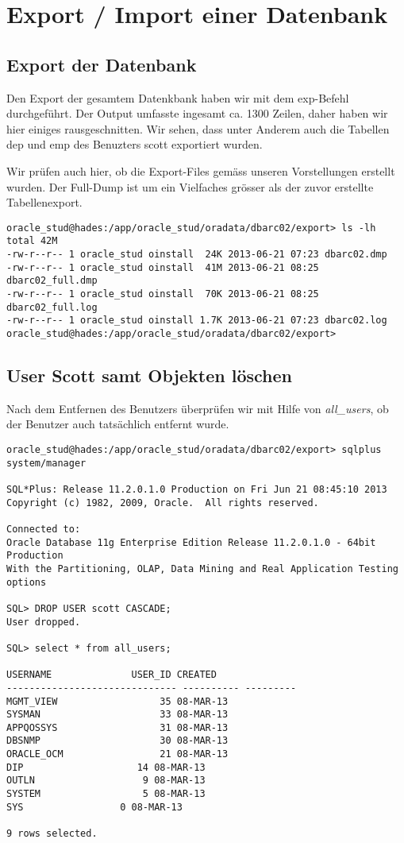 \documentclass[11pt,a4paper,parskip=half]{scrartcl}
\begin{document}
\newpage
\section{Export / Import einer Datenbank}
\subsection{Export der Datenbank}
Den Export der gesamtem Datenkbank haben wir mit dem exp-Befehl durchgeführt. Der Output umfasste ingesamt ca. 1300 Zeilen, daher haben wir hier einiges rausgeschnitten. Wir sehen, dass unter Anderem auch die Tabellen \glqq{}dep\grqq{} und \glqq{}emp\grqq{} des Benuzters scott exportiert wurden.


Wir prüfen auch hier, ob die Export-Files gemäss unseren Vorstellungen erstellt wurden. Der Full-Dump ist um ein Vielfaches grösser als der zuvor erstellte Tabellenexport.
\begin{lstlisting}
oracle_stud@hades:/app/oracle_stud/oradata/dbarc02/export> ls -lh
total 42M
-rw-r--r-- 1 oracle_stud oinstall  24K 2013-06-21 07:23 dbarc02.dmp
-rw-r--r-- 1 oracle_stud oinstall  41M 2013-06-21 08:25 dbarc02_full.dmp
-rw-r--r-- 1 oracle_stud oinstall  70K 2013-06-21 08:25 dbarc02_full.log
-rw-r--r-- 1 oracle_stud oinstall 1.7K 2013-06-21 07:23 dbarc02.log
oracle_stud@hades:/app/oracle_stud/oradata/dbarc02/export>
\end{lstlisting}

\subsection{User Scott samt Objekten löschen}
Nach dem Entfernen des Benutzers überprüfen wir mit Hilfe von \emph{all\_users}, ob der Benutzer auch tatsächlich entfernt wurde.
\begin{lstlisting}
oracle_stud@hades:/app/oracle_stud/oradata/dbarc02/export> sqlplus system/manager

SQL*Plus: Release 11.2.0.1.0 Production on Fri Jun 21 08:45:10 2013
Copyright (c) 1982, 2009, Oracle.  All rights reserved.

Connected to:
Oracle Database 11g Enterprise Edition Release 11.2.0.1.0 - 64bit Production
With the Partitioning, OLAP, Data Mining and Real Application Testing options

SQL> DROP USER scott CASCADE;
User dropped.

SQL> select * from all_users;

USERNAME			  USER_ID CREATED
------------------------------ ---------- ---------
MGMT_VIEW			       35 08-MAR-13
SYSMAN				       33 08-MAR-13
APPQOSSYS			       31 08-MAR-13
DBSNMP				       30 08-MAR-13
ORACLE_OCM			       21 08-MAR-13
DIP				       14 08-MAR-13
OUTLN					9 08-MAR-13
SYSTEM					5 08-MAR-13
SYS					0 08-MAR-13

9 rows selected.
\end{lstlisting}
\end{document}
